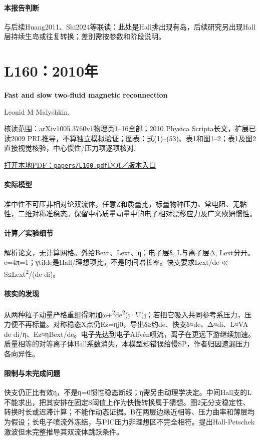 \paragraph{本报告判断}与后续Huang2011、Shi2024等联读：此处是Hall排出现有岛，后续研究另出现Hall层持续生岛或往复转换；差别需按参数和阶段说明。

\section{L160：2010年}\label{paper:L160}

\textbf{Fast and slow two-fluid magnetic reconnection}\citep{L160}\

Leonid M Malyshkin.

\textsf{核读范围：}arXiv1005.3760v1物理页1–16全部；2010 Physica Scripta长文，扩展已读2009 PRL推导，不算独立模拟验证；\textsf{图表：}式(1)–(53)、表1和图1–2；表1及图2直接视觉核验，中心惯性/压力项逐项核对.

\href{run:papers/L160.pdf}{打开本地PDF：\texttt{papers/L160.pdf}}\quad\href{https://doi.org/10.1088/0031-8949/2010/t142/014033}{DOI／版本入口}

\paragraph{实际模型}准中性不可压非相对论双流体，任意Z和质量比，标量物种压力、常电阻、无黏性，二维对称准稳态。保留中心质量动量中的电子相对漂移应力及广义欧姆惯性。

\paragraph{计算／实验细节}解析论文，无计算网格。外给Bext、Lext、η；电子层δ, L与离子层Δ, Lext分开。c=4π=1；γtilde是Hall/理想项比，不是时间增长率。快支要求Lext/de\ensuremath{\ll}S≤Lext\textsuperscript{2}/(de di)。

\paragraph{核实的发现}从两种粒子动量严格重组得附加ω+\textsuperscript{2}de\textsuperscript{2}(j·\ensuremath{\nabla})j；若把它吸入共同参考系压力，压力便不再标量。对称稳态X点仍Ez=ηj0，导出δ≥约de、快支δ≈de、Δ≈di、L≈VA de di/η、Ez≈ηBext/de。电子先达到电子Alfvén喷流，离子在更远下游继续加速。质量相等的对等离子体Hall系数消失，本模型却错误给慢SP，作者归因遗漏压力各向异性。

\paragraph{限制与未完成问题}快支仍正比有效η，不是η=0惯性稳态断线；η需另由动理学决定。中间Hall支的L不能求出，把其安排在固定S阈值上作为快慢转换属于猜想。图2无分支稳定性、转换时长或迟滞计算；不能作动态证据。B在两层边缘近相等、压力曲率和薄层均为假设；长电子喷流外冻结，与PIC压力非理想区不完全相符。提出Hall-Petschek激波但未完整推导其双流体跳跃条件。

